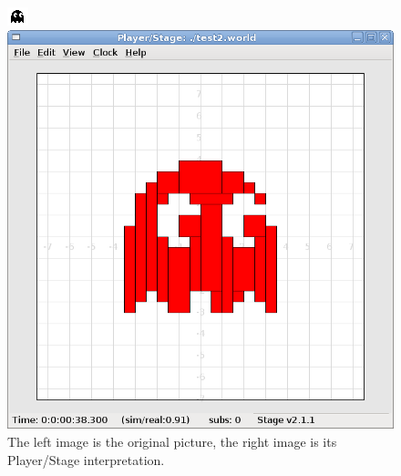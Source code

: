 \documentclass[a4paper]{report}
\newcommand{\plst}{Player/Stage\xspace}
\begin{document}
\begin{figure}
	\centering
	\begin{minipage}[c]{0.3\linewidth}
		\centering
		\includegraphics{./pics/oranges_box/ghost_original.png} %
		
	\end{minipage}%
	\hspace{0.05\linewidth}
	\begin{minipage}[c]{0.6\linewidth}
		\centering
		\includegraphics[width=\linewidth]{./pics/oranges_box/ghost_woutline.png} 
	\end{minipage}	
	\caption{The left image is the original picture, the right image is its \plst interpretation.}
		\label{fig:BuildingAWorld:OtherStuff:Ghosts}
\end{figure}
\end{document}
